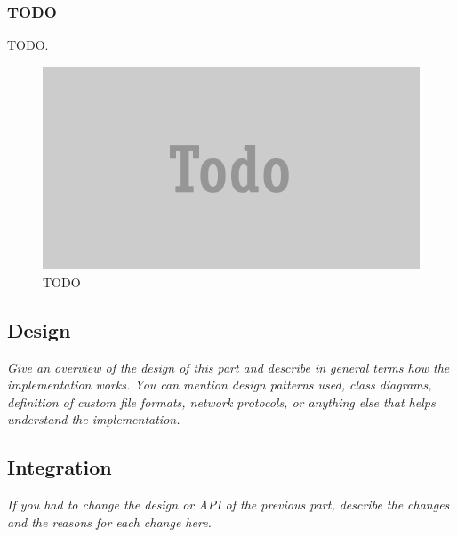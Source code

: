 \documentclass[JCDReport.tex]{subfiles}
\begin{document}
\subsubsection{TODO}
TODO.
\begin{figure}[h!]
	\centering
	\includegraphics[scale=1]{imageslukas/todo.png} 
	\caption{TODO}
\end{figure}











\subsection{Design}

\emph{Give an overview of the design of this part and describe in general terms how the implementation works. You can mention design patterns used, class diagrams, definition of custom file formats, network protocols, or anything else that helps understand the implementation.}


\subsection{Integration}

\emph{If you had to change the design or API of the previous part, describe the changes and the reasons for each change here.}
\end{document}
